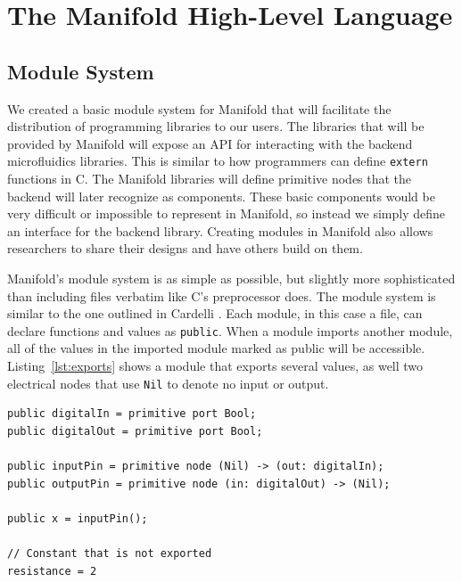 \section{The Manifold High-Level Language}

\subsection{Module System}

We created a basic module system for Manifold that will facilitate the
distribution of programming libraries to our users. The libraries that will be
provided by Manifold will expose an API for interacting with the backend
microfluidics libraries. This is similar to how programmers can define
\texttt{extern} functions in C. The Manifold libraries will define primitive
nodes that the backend will later recognize as components. These basic
components would be very difficult or impossible to represent in Manifold, so
instead we simply define an interface for the backend library. Creating
modules in Manifold also allows researchers to share their designs and have
others build on them.

Manifold's module system is as simple as possible, but slightly more
sophisticated than including files verbatim like C's preprocessor does.
The module system is similar to the one outlined in Cardelli
\cite{Cardelli:1997:PFL:263699.263735}. Each module, in this case a file, can
declare functions and values as \texttt{public}. When a module imports another
module, all of the values in the imported module marked as public will be
accessible. Listing~\ref{lst:exports} shows a module that exports several values, as well two
electrical nodes that use \texttt{Nil} to denote no input or output.

\begin{lstlisting}[label=lst:exports, caption=Exported values in a Manifold file]
public digitalIn = primitive port Bool;
public digitalOut = primitive port Bool;

public inputPin = primitive node (Nil) -> (out: digitalIn);
public outputPin = primitive node (in: digitalOut) -> (Nil);

public x = inputPin();

// Constant that is not exported
resistance = 2
\end{lstlisting}

